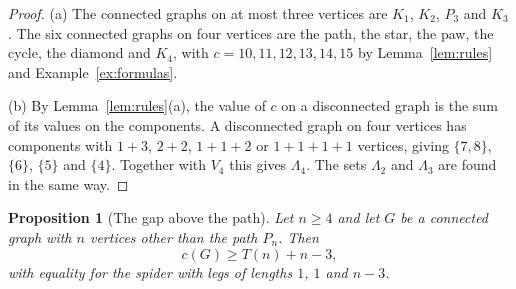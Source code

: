 \documentclass[11pt]{amsart}
\newtheorem{proposition}[theorem]{Proposition}
\theoremstyle{definition}
\theoremstyle{remark}
\newcommand{\Lam}{\Lambda}
\newcommand{\Tr}[1]{T(#1)}
\begin{document}
\begin{proof}
(a) The connected graphs on at most three vertices are $K_1$, $K_2$, $P_3$ and $K_3$. The six connected graphs on four vertices are the path, the star, the paw, the cycle, the diamond and $K_4$, with $c=10,11,12,13,14,15$ by Lemma~\ref{lem:rules} and Example~\ref{ex:formulas}.

(b) By Lemma~\ref{lem:rules}(a), the value of $c$ on a disconnected graph is the sum of its values on the components. A disconnected graph on four vertices has components with $1+3$, $2+2$, $1+1+2$ or $1+1+1+1$ vertices, giving $\{7,8\}$, $\{6\}$, $\{5\}$ and $\{4\}$. Together with $V_4$ this gives $\Lam_4$. The sets $\Lam_2$ and $\Lam_3$ are found in the same way.
\end{proof}

\begin{proposition}[The gap above the path]\label{prop:pathgap}
Let $n\ge4$ and let $G$ be a connected graph with $n$ vertices other than the path $P_n$. Then
\[
c(G)\ge\Tr{n}+n-3,
\]
with equality for the spider with legs of lengths $1$, $1$ and $n-3$.
\end{proposition}
\end{document}
